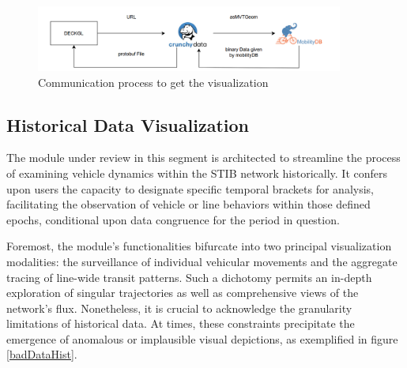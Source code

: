 \documentclass[12pt]{report}
\begin{document}
	\begin{center}
		\begin{figure}
			\centering
			\includegraphics[width=0.9\textwidth]{images/processMVTVisu.png}
			\caption{Communication process to get the visualization}
			\label{processMVTVisu}
		\end{figure}
	\end{center}
	
	\subsection{Historical Data Visualization}
	
	The module under review in this segment is architected to streamline the process of examining vehicle dynamics within the STIB network historically. It confers upon users the capacity to designate specific temporal brackets for analysis, facilitating the observation of vehicle or line behaviors within those defined epochs, conditional upon data congruence for the period in question.
	
	Foremost, the module's functionalities bifurcate into two principal visualization modalities: the surveillance of individual vehicular movements and the aggregate tracing of line-wide transit patterns. Such a dichotomy permits an in-depth exploration of singular trajectories as well as comprehensive views of the network's flux. Nonetheless, it is crucial to acknowledge the granularity limitations of historical data. At times, these constraints precipitate the emergence of anomalous or implausible visual depictions, as exemplified in figure \ref{badDataHist}.
	
\end{document}

